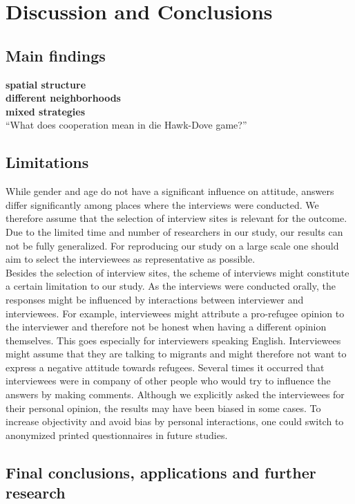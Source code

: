 \section{Discussion and Conclusions}

\subsection{Main findings}

\textbf{spatial structure}\\
\textbf{different neighborhoods}\\
\textbf{mixed strategies}\\

``What does cooperation mean in die Hawk-Dove game?''


\subsection{Limitations}
While gender and age do not have a significant influence on attitude, answers differ significantly among places where the interviews were conducted. We therefore assume that the selection of interview sites is relevant for the outcome. Due to the limited time and number of researchers in our study, our results can not be fully generalized. For reproducing our study on a large scale one should aim to select the interviewees as representative as possible.\\
Besides the selection of interview sites, the scheme of interviews might constitute a certain limitation to our study. As the interviews were conducted orally, the responses might be influenced by interactions between interviewer and interviewees. For example, interviewees might attribute a pro-refugee opinion to the interviewer and therefore not be honest when having a different opinion themselves. This goes especially for interviewers speaking English. Interviewees might assume that they are talking to migrants and might therefore not want to express a negative attitude towards refugees. Several times it occurred that interviewees were in company of other people who would try to influence the answers by making comments. Although we explicitly asked the interviewees for their personal opinion, the results may have been biased in some cases. To increase objectivity and avoid bias by personal interactions, one could switch to anonymized printed questionnaires in future studies.\\

\subsection{Final conclusions, applications and further research}

